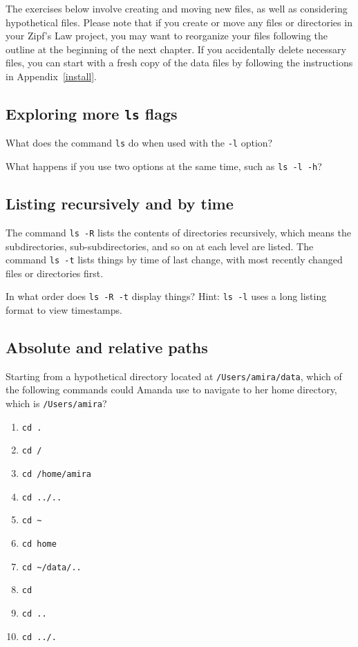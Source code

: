 \documentclass[
]{krantz}
\providecommand{\tightlist}{%
  \setlength{\itemsep}{0pt}\setlength{\parskip}{0pt}}
\begin{document}
The exercises below involve creating and moving new files,
as well as considering hypothetical files.
Please note that if you create or move any files or directories in your Zipf's Law project,
you may want to reorganize your files following the outline at the beginning of the next chapter.
If you accidentally delete necessary files,
you can start with a fresh copy of the data files
by following the instructions in Appendix~\ref{install}.

\hypertarget{bash-basics-ex-more-ls}{%
\subsection{\texorpdfstring{Exploring more \texttt{ls} flags}{Exploring more ls flags}}\label{bash-basics-ex-more-ls}}

What does the command \texttt{ls} do when used
with the \texttt{-l} option?

What happens if you use two options at the same time, such as \texttt{ls\ -l\ -h}?

\hypertarget{bash-basics-ex-ls-rt}{%
\subsection{Listing recursively and by time}\label{bash-basics-ex-ls-rt}}

The command \texttt{ls\ -R} lists the contents of directories recursively,
which means the subdirectories, sub-subdirectories, and so on at each level are listed.
The command \texttt{ls\ -t} lists things by time of last change,
with most recently changed files or directories first.

In what order does \texttt{ls\ -R\ -t} display things? Hint: \texttt{ls\ -l} uses a long listing
format to view timestamps.

\hypertarget{bash-basics-ex-paths}{%
\subsection{Absolute and relative paths}\label{bash-basics-ex-paths}}

Starting from a hypothetical directory located at \texttt{/Users/amira/data},
which of the following commands could Amanda use to navigate to her home directory,
which is \texttt{/Users/amira}?

\begin{enumerate}
\def\labelenumi{\arabic{enumi}.}
\tightlist
\item
  \texttt{cd\ .}
\item
  \texttt{cd\ /}
\item
  \texttt{cd\ /home/amira}
\item
  \texttt{cd\ ../..}
\item
  \texttt{cd\ \textasciitilde{}}
\item
  \texttt{cd\ home}
\item
  \texttt{cd\ \textasciitilde{}/data/..}
\item
  \texttt{cd}
\item
  \texttt{cd\ ..}
\item
  \texttt{cd\ ../.}
\end{enumerate}
\end{document}
